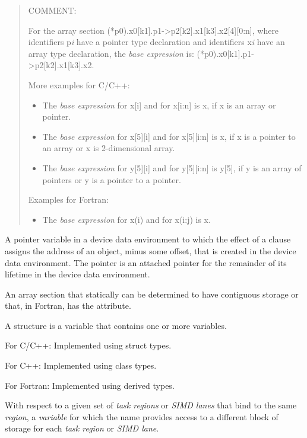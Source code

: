 \begin{quote}
COMMENT: 

For the array section
(*p0).x0[k1].p1->p2[k2].x1[k3].x2[4][0:n],
where identifiers p\emph{i} have a pointer type declaration and
identifiers x\emph{i} have an array type declaration, the
\emph{base expression} is:
(*p0).x0[k1].p1->p2[k2].x1[k3].x2.

More examples for C/C++:
\begin{itemize}
\item The \emph{base expression} for x[i] and for 
    x[i:n] is x, if x is an array or pointer.
\item The \emph{base expression} for x[5][i] and for x[5][i:n] is x, if x is a
    pointer to an array or x is 2-dimensional array.
\item The \emph{base expression} for y[5][i] and for y[5][i:n] is y[5], if
    y is an array of pointers or y is a pointer to a pointer.
\end{itemize}
Examples for Fortran:
\begin{itemize}
\item The \emph{base expression} for x(i) and for x(i:j) is x.
\end{itemize}
\end{quote}
\glossarydefend


\glossarydefstart
A pointer variable in a device data environment to which the effect of a
 clause assigns the address of an object, minus some offset,  that
is created in the device data environment. The pointer is an attached pointer
for the remainder of its lifetime in the device data environment.
\glossarydefend
\bigskip

\glossarydefstart
An array section that statically can be determined to have contiguous 
storage or that, in Fortran, has the  attribute.
\glossarydefend
\bigskip

\glossarydefstart
A structure is a variable that contains one or more variables.

For C/C++:
\nopagebreak
Implemented using struct types.

For C++:
\nopagebreak
Implemented using class types.

For Fortran:
\nopagebreak
Implemented using derived types.
\glossarydefend

\glossarydefstart
With respect to a given set of \emph{task regions} or \emph{SIMD lanes} 
that bind to the same  \emph{region}, a \emph{variable} 
for which the name provides access to a different block of
storage for each \emph{task region} or \emph{SIMD lane}.

